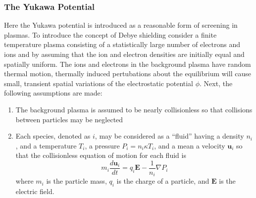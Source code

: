 \subsubsection{The Yukawa Potential}
Here the Yukawa potential is introduced as a reasonable form of screening in plasmas. To introduce the concept of Debye shielding consider a finite temperature plasma consisting of a statistically large number of electrons and ions and by assuming that the ion and electron densities are initially equal and spatially uniform. The ions and electrons in the background plasma have random thermal motion, thermally induced pertubations about the equilibrium will cause small, transient spatial variations of the electrostatic potential $\phi$. Next, the following assumptions are made:
\begin{enumerate}
    \item The background plasma is assumed to be nearly collisionless so that collisions between particles may be neglected
    \item Each species, denoted as $i$, may be considered as a ``fluid'' having a density $n_i$, and a temperature $T_i$, a pressure $P_i = n_i \kappa T_i$, and a mean a velocity $\boldsymbol{u}_i$ so that the collisionless equation of motion for each fluid is
    \begin{equation} \label{eqn:collisionless-motion}
        m_i \dfrac{d \boldsymbol{u}_i}{dt} = q_i \boldsymbol{E} - \dfrac{1}{n_i} \nabla P_i
    \end{equation}
    where $m_i$ is the particle mass, $q_i$ is the charge of a particle, and $\boldsymbol{E}$ is the electric field.
\end{enumerate}

